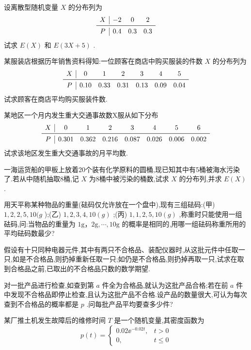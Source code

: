 \begin{xiti}
\item 设离散型随机变量 $ X $ 的分布列为
\[
\begin{array}{c|ccc}
X & {-2} & {0} & {2} \\ \midrule 
P & {0.4} & {0.3} & {0.3} \\ 
\end{array}
\]
试求 $ E(X) $ 和 $ E(3X+5) $ .
\item 某服装店根据历年销售资料得知:一位顾客在商店中购买服装的件数 $ X $ 的分布列为
\[
\begin{array}{c|cccccc}
X & {0} & {1} & {2} & {3} & {4} & {5} \\ \midrule
P & {0.10} & {0.33} & {0.31} & {0.13} & {0.09} & {0.04}
\end{array}
\]
试求顾客在商店平均购买服装件数.
\item 某地区一个月内发生重大交通事故数X服从如下分布
\[
\begin{array}{c|ccccccc}
X     & 0     & 1     & 2     & 3     & 4     & 5     & 6 \\\midrule
P     & 0.301 & 0.362 & 0.216 & 0.087 & 0.026 & 0.006 & 0.002 \\
\end{array}
\]
试求该地区发生重大交通事故的月平均数.
\item 一海运货船的甲板上放着20个装有化学原料的圆桶,现已知其中有5桶被海水污染了.若从中随机抽取8桶,记 $ X $ 为8桶中被污染的桶数,试求 $ X $ 的分布列,并求 $ E(X) $ .
\item 用天平称某种物品的重量(砝码仅允许放在一个盘中),现有三组砝码:(甲) $ 1,2,2,5,
10(g $ );(乙) $ 1,2,3,4,10(g) $ ;(丙) $ 1,1,2,5,10(g) $ ,称重时只能使用一组砝码,问:当物品的重量为 $ 1 \mathrm{g}， 2 \mathrm{g}, \cdots, 10 \mathrm{g} $ 的概率是相同的,用哪一组砝码称重所用的平均砝码数最少?
\item 假设有十只同种电器元件,其中有两只不合格品、装配仪器时,从这批元件中任取一只,如是不合格品,则扔掉重新任取一只;如仍是不合格品,则扔掉再取一只,试求在取到合格品之前,已取出的不合格品只数的数学期望.
\item 对一批产品进行检查,如查到第 $ a $ 件全为合格品,就认为这批产品合格;若在前 $ a $ 件中发现不合格品即停止检查,且认为这批产品不合格.设产品的数量很大,可认为每次查到不合格品的概率都是 $ p $ .问每批产品平均要查多少件?
\item 某厂推土机发生故障后的维修时间 $ T $ 是一个随机变量,其密度函数为
\[
p(t)=\left\{\begin{array}{ll}
{0.02 \ee ^{-0.02 t},} & {t>0} \\ 
{0,} & {t \leqslant 0}

\end{array}\]
\end{xiti}
